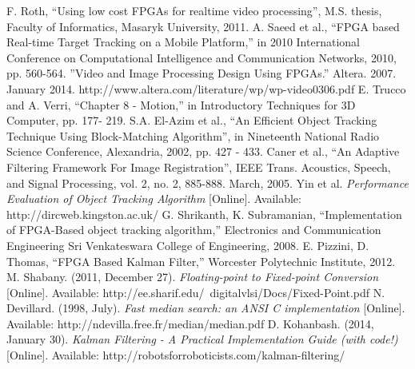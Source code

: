 \documentclass[11pt]{article} %
\begin{document}
\begin{thebibliography}{11}
F. Roth, “Using low cost FPGAs for realtime video processing”, M.S. thesis, Faculty of Informatics, Masaryk University, 2011.
A. Saeed et al., “FPGA based Real-time Target Tracking on a Mobile Platform,” in 2010 International Conference on Computational Intelligence and Communication Networks, 2010, pp. 560-564.
”Video and Image Processing Design Using FPGAs.” Altera. 2007. January 2014. 
http://www.altera.com/literature/wp/wp-video0306.pdf  
E. Trucco and A. Verri, “Chapter 8 - Motion,” in Introductory Techniques for 3D Computer, pp. 177- 219.
S.A. El-Azim et al., “An Efficient Object Tracking Technique Using Block-Matching Algorithm”, in Nineteenth National Radio Science Conference, Alexandria, 2002, pp. 427 - 433.
Caner et al., “An Adaptive Filtering Framework For Image Registration”, IEEE Trans. Acoustics, Speech, and Signal Processing, vol. 2, no. 2, 885-888. March, 2005. 
Yin et al. \textit{Performance Evaluation of Object Tracking Algorithm} [Online]. Available: http://dircweb.kingston.ac.uk/ 
G. Shrikanth, K. Subramanian, “Implementation of FPGA-Based object tracking algorithm,” Electronics and Communication Engineering Sri Venkateswara College of Engineering, 2008.
E. Pizzini, D. Thomas, “FPGA Based Kalman Filter,” Worcester Polytechnic Institute, 2012.
M. Shabany. (2011, December 27). \textit{Floating-point to Fixed-point Conversion} [Online]. Available: http://ee.sharif.edu/~digitalvlsi/Docs/Fixed-Point.pdf
N. Devillard. (1998, July). \textit{Fast median search: an ANSI C implementation} [Online]. Available: http://ndevilla.free.fr/median/median.pdf
D. Kohanbash. (2014, January 30). \textit{Kalman Filtering - A Practical Implementation Guide (with code!)} [Online]. Available: http://robotsforroboticists.com/kalman-filtering/
\end{thebibliography}
\newpage
\appendix
\appendixpage
\end{document}
